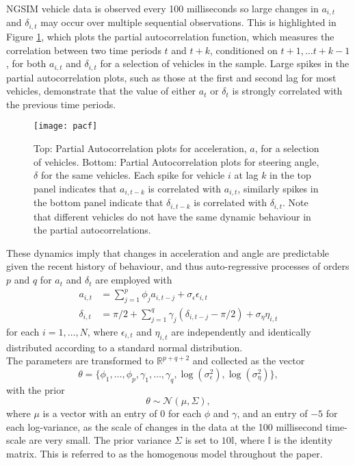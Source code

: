 \documentclass[12pt,a4paper]{article}\usepackage[]{graphicx}\usepackage[]{color}
\begin{document}
NGSIM vehicle data is observed every 100 milliseconds so large changes in $a_{i, t}$ and $\delta_{i, t}$ may occur over multiple sequential observations. This is highlighted in Figure \ref{fig:pacf}, which plots the partial autocorrelation function, which measures the correlation between two time periods $t$ and $t + k$, conditioned on $t + 1, \dots t + k -1$, for both $a_{i, t}$ and $\delta_{i, t}$ for a selection of vehicles in the sample. Large spikes in the partial autocorrelation plots, such as those at the first and second lag for most vehicles, demonstrate that the value of either $a_t$ or $\delta_t$ is strongly correlated with the previous time periods. 
\\

\begin{figure}
\centering
\texttt{[image: pacf]}
\caption{Top: Partial Autocorrelation plots for acceleration, $a$, for a selection of vehicles. Bottom: Partial Autocorrelation plots for steering angle, $\delta$ for the same vehicles. Each spike for vehicle $i$ at lag $k$ in the top panel indicates that $a_{i, t-k}$ is correlated with $a_{i, t}$, similarly spikes in the bottom panel indicate that $\delta_{i, t-k}$ is correlated with $\delta_{i, t}$. Note that different vehicles do not have the same dynamic behaviour in the partial autocorrelations.}
\label{fig:pacf}
\end{figure}

These dynamics imply that changes in acceleration and angle are predictable given the recent history of behaviour, and thus auto-regressive processes of orders $p$ and $q$ for $a_t$ and $\delta_t$ are employed with
\begin{align}
a_{i, t} &= \sum_{j = 1}^p \phi_{j} a_{i, t-j} + \sigma_{\epsilon} \epsilon_{i, t} \label{aAR} \\
\delta_{i, t} &= \pi/2 + \sum_{j = 1}^q \gamma_{j} (\delta_{i, t-j} - \pi/2) + \sigma_{\eta} \eta_{i, t} \label{dAR}
\end{align}
for each $i = 1, \dots, N$, where $\epsilon_{i, t}$ and $\eta_{i, t}$ are independently and identically distributed according to a standard normal distribution.
\\

The parameters are transformed to $\mathbb{R}^{p + q + 2}$ and collected as the vector
\begin{equation*}
\label{thetaVec}
\theta = \{\phi_{1}, \dots, \phi_{p}, \gamma_{1}, \dots, \gamma_{q}, \log(\sigma^{2}_{\epsilon}), \log(\sigma^{2}_{\eta})\},
\end{equation*}
with the prior
\begin{equation}
\label{indPrior}
\theta \sim \mathcal{N}\left(\mu, \Sigma \right),
\end{equation}
where $\mu$ is a vector with an entry of $0$ for each $\phi$ and $\gamma$, and an entry of $-5$ for each log-variance, as the scale of changes in the data at the 100 millisecond time-scale are very small. The prior variance $\Sigma$ is set to $10 \mathbb{I}$, where $\mathbb{I}$ is the identity matrix. This is referred to as the homogenous model throughout the paper.
\end{document}
